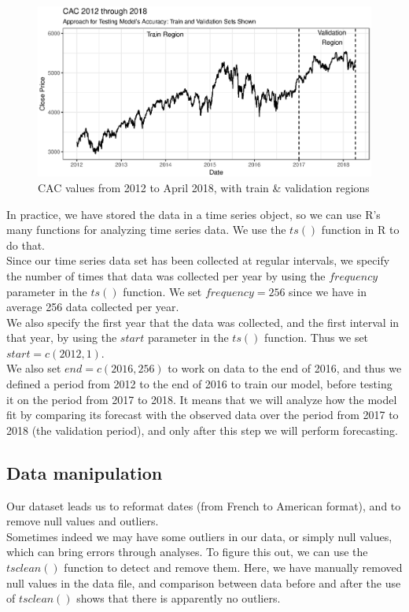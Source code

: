 \FloatBarrier
\begin{figure}[!htbp]
  \centering
  \includegraphics[width=\textwidth]{img/Plot3.eps}
  \caption{CAC values from 2012 to April 2018, with train \& validation regions}
\end{figure}
\FloatBarrier

In practice, we have stored the data in a time series object, so we can use R’s many functions for analyzing time series data. We use the $ts()$ function in R to do that. \\
Since our time series data set has been collected at regular intervals, we specify the number of times that data was collected per year by using the $frequency$ parameter in the $ts()$ function. We set $frequency = 256$ since we have in average 256 data collected per year. \\
We also specify the first year that the data was collected, and the first interval in that year, by using the $start$ parameter in the $ts()$ function. Thus we set $start=c(2012,1)$. \\
We also set $end=c(2016,256)$ to work on data to the end of 2016, and thus we defined a period from 2012 to the end of 2016 to train our model, before testing it on the period from 2017 to 2018. It means that we will analyze how the model fit by comparing its forecast with the observed data over the period from 2017 to 2018 (the validation period), and only after this step we will perform forecasting.
 

\subsection{Data manipulation}
Our dataset leads us to reformat dates (from French to American format), and to remove null values and outliers. \\
Sometimes indeed we may have some outliers in our data, or simply null values, which can bring errors through analyses. To figure this out, we can use the $tsclean()$ function to detect and remove them. Here, we have manually removed null values in the data file, and comparison between data before and after the use of $tsclean()$ shows that there is apparently no outliers. \\


